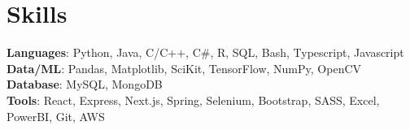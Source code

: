 \section{Skills}
 \begin{itemize}[leftmargin=0.15in, label={}]
    \small{\item{
     \textbf{Languages}{: Python, Java, C/C++, C\#, R, SQL, Bash, Typescript, Javascript} \\
     \textbf{Data/ML}{: Pandas, Matplotlib, SciKit, TensorFlow, NumPy, OpenCV} \\
     \textbf{Database}{: MySQL, MongoDB} \\
     \textbf{Tools}{: React, Express, Next.js, Spring, Selenium, Bootstrap, SASS, Excel, PowerBI, Git, AWS} \\
     
    }}
 \end{itemize}
